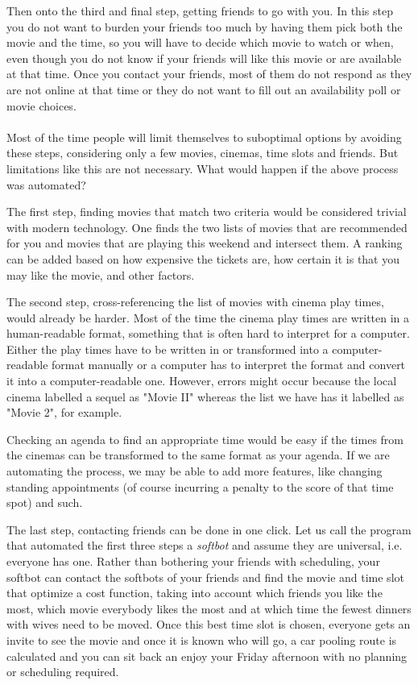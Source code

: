 \documentclass{article}
\begin{document}
 Then onto the third and final step, getting friends to go with you. In this step you do not want to burden your friends too much by having them pick both the movie and the time, so you will have to decide which movie to watch or when, even though you do not know if your friends will like this movie or are available at that time. Once you contact your friends, most of them do not respond as they are not online at that time or they do not want to fill out an availability poll or movie choices.
 \paragraph{}
 Most of the time people will limit themselves to suboptimal options by avoiding these steps, considering only a few movies, cinemas, time slots and friends. But limitations like this are not necessary. What would happen if the above process was automated?
 
The first step, finding movies that match two criteria would be considered trivial with modern technology. One finds the two lists of movies that are recommended for you and movies that are playing this weekend and intersect them. A ranking can be added based on how expensive the tickets are, how certain it is that you may like the movie, and other factors. 

 The second step, cross-referencing the list of movies with cinema play times, would already be harder. Most of the time the cinema play times are written in a human-readable format, something that is often hard to interpret for a computer. Either the play times have to be written in or transformed into a computer-readable format manually or a computer has to interpret the format and convert it into a computer-readable one. However, errors might occur because the local cinema labelled a sequel as "Movie II" whereas the list we have has it labelled as "Movie 2", for example.
 
 Checking an agenda to find an appropriate time would be easy if the times from the cinemas can be transformed to the same format as your agenda. If we are automating the process, we may be able to add more features, like changing standing appointments (of course incurring a penalty to the score of that time spot) and such.
 
 The last step, contacting friends can be done in one click. Let us call the program that automated the first three steps a \emph{softbot} and assume they are universal, i.e. everyone has one. Rather than bothering your friends with scheduling, your softbot can contact the softbots of your friends and find the movie and time slot that optimize a cost function, taking into account which friends you like the most, which movie everybody likes the most and at which time the fewest dinners with wives need to be moved. Once this best time slot is chosen, everyone gets an invite to see the movie and once it is known who will go, a car pooling route is calculated and you can sit back an enjoy your Friday afternoon with no planning or scheduling required.
\end{document}
